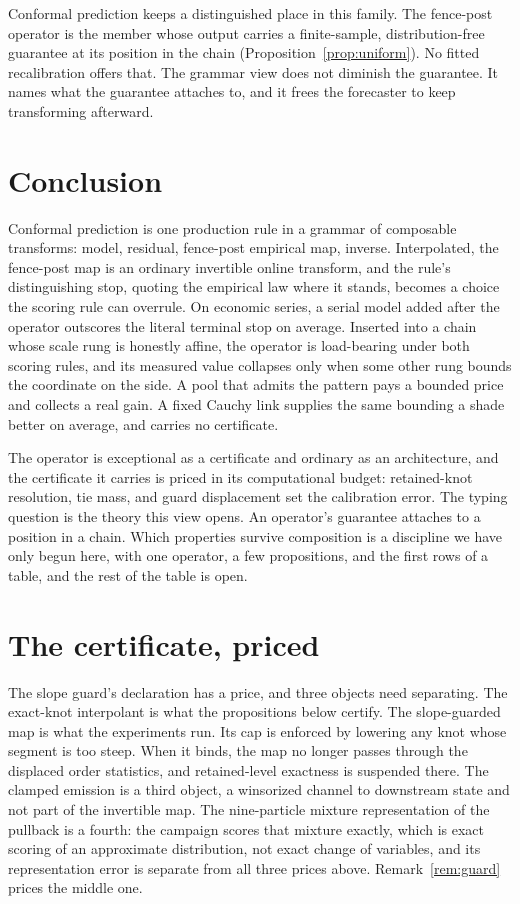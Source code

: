 \documentclass[11pt]{article}
\theoremstyle{remark}
\begin{document}
Conformal prediction keeps a distinguished place in this family. The fence-post operator is the member whose output carries a
finite-sample, distribution-free guarantee at its position in the chain
(Proposition~\ref{prop:uniform}). No fitted recalibration offers that. The grammar view
does not diminish the guarantee. It names what the guarantee attaches to, and it frees the
forecaster to keep transforming afterward.

\section{Conclusion}\label{sec:conclusion}

Conformal prediction is one production rule in a grammar of composable transforms: model,
residual, fence-post empirical map, inverse. Interpolated, the fence-post map is an ordinary
invertible online transform, and the rule's distinguishing stop, quoting the empirical law
where it stands, becomes a choice the scoring rule can overrule. On economic series,
a serial model added after the operator outscores the literal terminal stop on
average. Inserted into a chain whose scale rung is honestly affine, the operator is
load-bearing under both scoring rules, and its measured value collapses only when
some other rung bounds the coordinate on the side. A pool that admits the
pattern pays a bounded price and collects a real gain. A fixed Cauchy link supplies
the same bounding a shade better on average, and carries no certificate.

The operator is exceptional as a certificate and ordinary as an architecture, and
the certificate it carries is priced in its computational budget: retained-knot
resolution, tie mass, and guard displacement set the calibration error. The
typing question is the theory this view opens. An operator's guarantee attaches to a position in a chain. Which properties survive
composition is a discipline we have only begun here, with one operator, a few
propositions, and the first rows of a table, and the rest of the table is open.

\appendix
\section{The certificate, priced}\label{app:certificate}

The slope guard's declaration has a price, and three objects need separating. The exact-knot
interpolant is what the propositions below certify. The
slope-guarded map is what the experiments run. Its cap is enforced by lowering any
knot whose segment is too steep. When it binds, the map no longer passes through the
displaced order statistics, and retained-level exactness is suspended there. The
clamped emission is a third object, a winsorized channel to downstream state and not
part of the invertible map. The nine-particle mixture representation of the pullback
is a fourth: the campaign scores that mixture exactly, which is exact scoring of an
approximate distribution, not exact change of variables, and its representation error
is separate from all three prices above. Remark~\ref{rem:guard} prices the middle one.
\end{document}
